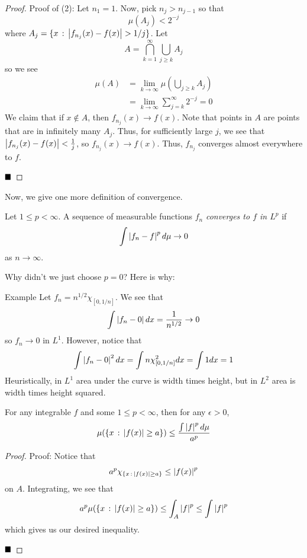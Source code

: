 \vspace{0.2cm}

\begin{proof}{Proof of (2):}
    Let $n_1 = 1$. Now, pick $n_{j} > n_{j - 1}$ so that
    \[ \mu(A_{j}) < 2^{-j} \]
    where $A_{j} = \{x \, :\, \left\lvert {f_{n_{j}}(x) - f(x)} \right\rvert > 1/j\}$. Let
    \[ A = \bigcap_{k = 1}^{\infty} \bigcup_{j \geq k} A_{j} \]
    so we see 
    \begin{align*}
        \mu(A) &= \lim_{k \to \infty} \mu\left(\bigcup_{j \geq k} A_{j}\right)\\
        &= \lim_{k \to \infty} \sum_{j = k}^{\infty} 2^{-j} = 0
    \end{align*}
    We claim that if $x \notin A$, then $f_{n_{j}}(x) \to f(x)$. Note that points in $A$ are points that are in infinitely many $A_{j}$. Thus, for sufficiently large $j$, we see that $\left\lvert {f_{n_{j}}(x) - f(x)} \right\rvert < \frac{1}{j}$, so $f_{n_{j}}(x) \to f(x)$. Thus, $f_{n_{j}}$ converges almost everywhere to $f$. 

    $\qed$
\end{proof}

Now, we give one more definition of convergence. 

\begin{definition}
    Let $1 \leq p < \infty$. A sequence of measurable functions $f_n$ \emph{converges to $f$ in $L^{p}$} if
    \[ \int \left\lvert {f_n - f} \right\rvert^{p}d\mu \to 0 \]
    as $n \to \infty$. 
\end{definition}

Why didn't we just choose $p = 0$? Here is why:

\begin{example}{Example}
    Let $f_n = n^{1/2}\chi_{[0, 1/n]}$. We see that
    \[ \int \left\lvert {f_n - 0} \right\rvert dx = \frac{1}{n^{1/2}} \to 0 \]
    so $f_n \to 0$ in $L^{1}$. However, notice that
    \[ \int \left\lvert {f_n - 0} \right\rvert^2 dx = \int n\chi_{[0, 1/n]}^2 dx = \int 1 dx = 1 \]
    Heuristically, in $L^1$ area under the curve is width times height, but in $L^2$ area is width times height squared. 
\end{example}

\begin{theorem}
    For any integrable $f$ and some $1 \leq p < \infty$, then for any $\epsilon > 0$, 
    \[ \mu(\{x \, :\, \left\lvert {f(x)} \right\rvert \geq a\}) \leq \frac{\int \left\lvert {f} \right\rvert^{p} d\mu}{a^{p}} \]
\end{theorem}
\begin{proof}{Proof:}
    Notice that
    \[ a^{p}\chi_{\{x \, :\, \left\lvert {f(x)} \right\rvert \geq a\}} \leq \left\lvert {f(x)} \right\rvert^{p} \]
    on $A$. Integrating, we see that
    \[ a^{p}\mu(\{x \, :\, \left\lvert {f(x)} \right\rvert \geq a\}) \leq \int_{A} \left\lvert {f} \right\rvert^{p} \leq \int \left\lvert {f} \right\rvert^{p} \]
    which gives us our desired inequality.

    $\qed$
\end{proof}

